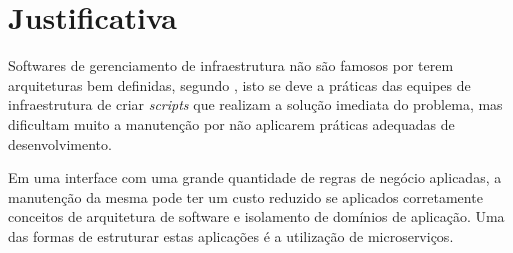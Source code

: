 \section{Justificativa}

  Softwares de gerenciamento de infraestrutura não são famosos por terem
  arquiteturas bem definidas, segundo \cite{Tobin2006}, isto
  se deve a práticas das equipes de infraestrutura de criar \textit{scripts}
  que realizam a solução imediata do problema, mas dificultam muito a
  manutenção por não aplicarem práticas adequadas de desenvolvimento.

  Em uma interface com uma grande quantidade de regras de negócio aplicadas,
  a manutenção da mesma pode ter um custo reduzido se aplicados corretamente
  conceitos de arquitetura de software e isolamento de domínios de aplicação.
  Uma das formas de estruturar estas aplicações é a utilização de
  microserviços.
